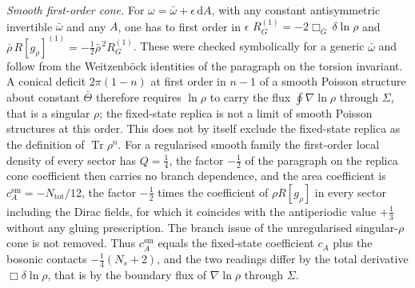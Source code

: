 \emph{Smooth first-order cone.} For \(\omega=\bar\omega+\epsilon\,\mathrm dA\), with any constant antisymmetric invertible \(\bar\omega\) and any \(A\), one has to first order in \(\epsilon\) \(R_G^{(1)}=-2\Box_{\bar G}\,\delta\ln\rho\) and \(\bar\rho\,R[g_\rho]^{(1)}=-\tfrac12\bar\rho^{\,2}R_G^{(1)}\). These were checked symbolically for a generic \(\bar\omega\) and follow from the Weitzenb\"ock identities of the paragraph on the torsion invariant. A conical deficit \(2\pi(1-n)\) at first order in \(n-1\) of a smooth Poisson structure about constant \(\bar\Theta\) therefore requires \(\ln\rho\) to carry the flux \(\oint\nabla\ln\rho\) through \(\Sigma\), that is a singular \(\rho\); the fixed-state replica is not a limit of smooth Poisson structures at this order. This does not by itself exclude the fixed-state replica as the definition of \(\operatorname{Tr}\rho^n\). For a regularised smooth family the first-order local density of every sector has \(Q=\tfrac14\), the factor \(-\tfrac12\) of the paragraph on the replica cone coefficient then carries no branch dependence, and the area coefficient is \(c_A^{\mathrm{sm}}=-N_{\mathrm{tot}}/12\), the factor \(-\tfrac12\) times the coefficient of \(\rho R[g_\rho]\) in every sector including the Dirac fields, for which it coincides with the antiperiodic value \(+\tfrac13\) without any gluing prescription. The branch issue of the unregularised singular-\(\rho\) cone is not removed. Thus \(c_A^{\mathrm{sm}}\) equals the fixed-state coefficient \(c_A\) plus the bosonic contacts \(-\tfrac14(N_s+2)\), and the two readings differ by the total derivative \(\Box\delta\ln\rho\), that is by the boundary flux of \(\nabla\ln\rho\) through \(\Sigma\).



